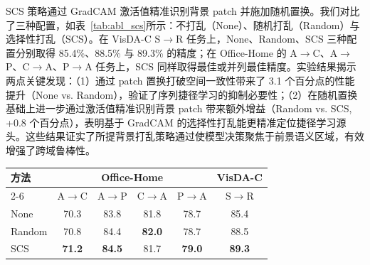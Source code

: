 SCS 策略通过 GradCAM 激活值精准识别背景 patch 并施加随机置换。我们对比了三种配置，如表~\ref{tab:abl_scs}所示：不打乱（None）、随机打乱（Random）与选择性打乱（SCS）。在 VisDA-C S$\rightarrow$R 任务上，None、Random、SCS 三种配置分别取得 85.4\%、88.5\% 与 89.3\% 的精度；在 Office-Home 的 A$\rightarrow$C、A$\rightarrow$P、C$\rightarrow$A、P$\rightarrow$A 任务上，SCS 同样取得最佳或并列最佳精度。实验结果揭示两点关键发现：（1）通过 patch 置换打破空间一致性带来了 3.1 个百分点的性能提升（None vs. Random），验证了序列捷径学习的抑制必要性；（2）在随机置换基础上进一步通过激活值精准识别背景 patch 带来额外增益（Random vs. SCS, +0.8 个百分点），表明基于 GradCAM 的选择性打乱能更精准定位捷径学习源头。这些结果证实了所提背景打乱策略通过使模型决策聚焦于前景语义区域，有效增强了跨域鲁棒性。

\begin{table}[!htbp]
    \vspace{0.5em}\centering\wuhao
    \begin{tabular}{lccccc}
    \toprule
    \multirow{2}{*}{方法}  & \multicolumn{4}{c}{Office-Home} & VisDA-C \\
    \cmidrule{2-6}
    & A$\rightarrow$C & A$\rightarrow$P & C$\rightarrow$A & P$\rightarrow$A & S$\rightarrow$R \\
    \midrule
    None  & 70.3 & 83.8 & 81.8 & 78.7 & 85.4 \\
    Random & 70.8 & 84.4 & \textbf{82.0} & 78.7 & 88.5 \\
    SCS & \textbf{71.2} & \textbf{84.5} & 81.7 & \textbf{79.0} & \textbf{89.3} \\
    \bottomrule
    \end{tabular}
\end{table}




